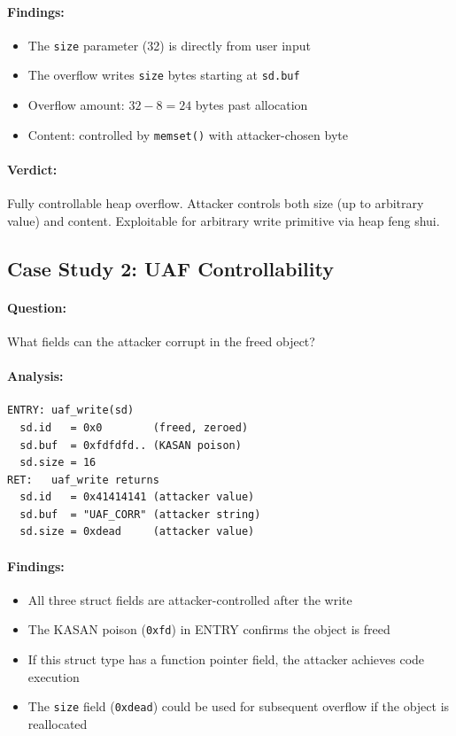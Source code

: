 \documentclass{ndss}
\begin{document}
\paragraph{Findings:}
\begin{itemize}[nosep]
  \item The \texttt{size} parameter (32) is directly from user input
  \item The overflow writes \texttt{size} bytes starting at \texttt{sd.buf}
  \item Overflow amount: $32 - 8 = 24$ bytes past allocation
  \item Content: controlled by \texttt{memset()} with attacker-chosen byte
\end{itemize}

\paragraph{Verdict:} Fully controllable heap overflow. Attacker controls both
size (up to arbitrary value) and content. Exploitable for arbitrary write
primitive via heap feng shui.

\subsection{Case Study 2: UAF Controllability}

\paragraph{Question:} What fields can the attacker corrupt in the freed object?

\paragraph{Analysis:}
\begin{lstlisting}[numbers=none]
ENTRY: uaf_write(sd)
  sd.id   = 0x0        (freed, zeroed)
  sd.buf  = 0xfdfdfd.. (KASAN poison)
  sd.size = 16
RET:   uaf_write returns
  sd.id   = 0x41414141 (attacker value)
  sd.buf  = "UAF_CORR" (attacker string)
  sd.size = 0xdead     (attacker value)
\end{lstlisting}

\paragraph{Findings:}
\begin{itemize}[nosep]
  \item All three struct fields are attacker-controlled after the write
  \item The KASAN poison (\texttt{0xfd}) in ENTRY confirms the object is freed
  \item If this struct type has a function pointer field, the attacker achieves
        code execution
  \item The \texttt{size} field (\texttt{0xdead}) could be used for subsequent
        overflow if the object is reallocated
\end{itemize}
\end{document}
